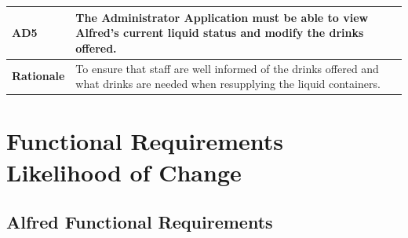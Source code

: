 \documentclass [11pt]{article}
\begin{document}
\begin{longtable}{| p{ } | p{ } | }\hline 
\rowcolor{tableCell}\textbf{AD5} & The Administrator Application must be able to view Alfred's current liquid status and modify the drinks offered. \\ \hline
\textbf{Rationale} &  To ensure that staff are well informed of the drinks offered and what drinks are needed when resupplying the liquid containers. \\ \hline
\end{longtable}



\pagebreak
\section{Functional Requirements Likelihood of Change}

\subsection{Alfred Functional Requirements}
\end{document}
